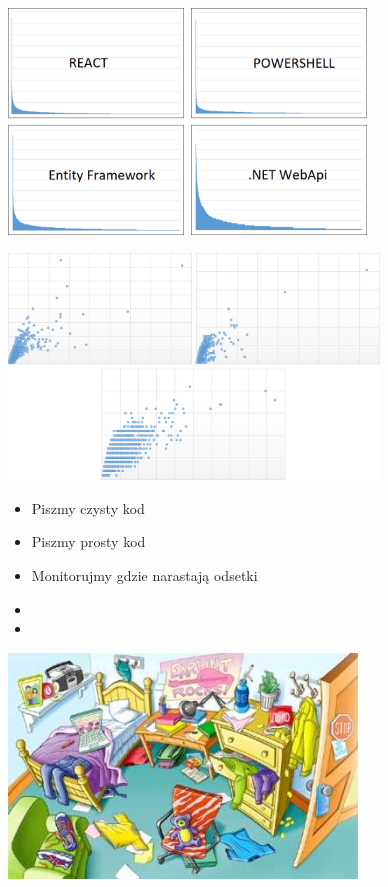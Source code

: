 \documentclass{beamer}
\begin{document}
\begin{frame}{}
\begin{center}
  	\includegraphics[height=6cm]{git_log5.png}
\end{center}
\end{frame}

\begin{frame}{}
\begin{center}
  	\includegraphics[height=6cm]{git_advanced.png}
\end{center}
\end{frame}

\begin{frame}{}
     \begin{Large}
	\begin{itemize}
		\item Piszmy czysty kod
		\item Piszmy prosty kod
		\item Monitorujmy gdzie narastają odsetki
		\item 
		\item 
	\end{itemize}
     \end{Large}
\end{frame}

\begin{frame}{}
\begin{center}
  	\includegraphics[height=6cm]{mess.jpeg}
\end{center}
\end{frame}
\end{document}
